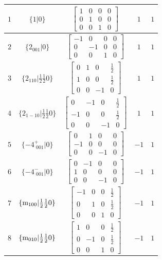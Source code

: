 \documentclass[fleqn,8pt]{jsarticle}
\begin{document}
\begin{longtable}{ccccc}
$ 1 $ & $ \{1|0\} $ & $ \begin{bmatrix} 1 & 0 & 0 & 0 \\ 0 & 1 & 0 & 0 \\ 0 & 0 & 1 & 0 \end{bmatrix} $ & $ 1 $ & $ 1 $ \\ \hline
$ 2 $ & $ \{2{}_{001}|0\} $ & $ \begin{bmatrix} -1 & 0 & 0 & 0 \\ 0 & -1 & 0 & 0 \\ 0 & 0 & 1 & 0 \end{bmatrix} $ & $ 1 $ & $ 1 $ \\ \hline
$ 3 $ & $ \{2{}_{110}|\frac{1}{2} \frac{1}{2} 0\} $ & $ \begin{bmatrix} 0 & 1 & 0 & \frac{1}{2} \\ 1 & 0 & 0 & \frac{1}{2} \\ 0 & 0 & -1 & 0 \end{bmatrix} $ & $ 1 $ & $ 1 $ \\ \hline
$ 4 $ & $ \{2{}_{1-10}|\frac{1}{2} \frac{1}{2} 0\} $ & $ \begin{bmatrix} 0 & -1 & 0 & \frac{1}{2} \\ -1 & 0 & 0 & \frac{1}{2} \\ 0 & 0 & -1 & 0 \end{bmatrix} $ & $ 1 $ & $ 1 $ \\ \hline
$ 5 $ & $ \{-4^{+}_{\,\,001}|0\} $ & $ \begin{bmatrix} 0 & 1 & 0 & 0 \\ -1 & 0 & 0 & 0 \\ 0 & 0 & -1 & 0 \end{bmatrix} $ & $ -1 $ & $ 1 $ \\ \hline
$ 6 $ & $ \{-4^{-}_{\,\,001}|0\} $ & $ \begin{bmatrix} 0 & -1 & 0 & 0 \\ 1 & 0 & 0 & 0 \\ 0 & 0 & -1 & 0 \end{bmatrix} $ & $ -1 $ & $ 1 $ \\ \hline
$ 7 $ & $ \{{\rm m}_{100}|\frac{1}{2} \frac{1}{2} 0\} $ & $ \begin{bmatrix} -1 & 0 & 0 & \frac{1}{2} \\ 0 & 1 & 0 & \frac{1}{2} \\ 0 & 0 & 1 & 0 \end{bmatrix} $ & $ -1 $ & $ 1 $ \\ \hline
$ 8 $ & $ \{{\rm m}_{010}|\frac{1}{2} \frac{1}{2} 0\} $ & $ \begin{bmatrix} 1 & 0 & 0 & \frac{1}{2} \\ 0 & -1 & 0 & \frac{1}{2} \\ 0 & 0 & 1 & 0 \end{bmatrix} $ & $ -1 $ & $ 1 $ \\ \hline

\end{longtable}
\end{document}
